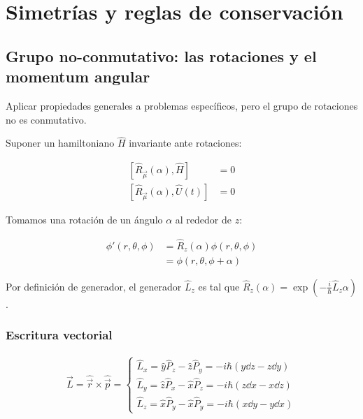 \chapter{Simetrías y reglas de conservación}

\section{}

\section{}

\section{Grupo no-conmutativo: las rotaciones y el momentum angular}

Aplicar propiedades generales a problemas específicos, pero el grupo de rotaciones no es conmutativo.

Suponer un hamiltoniano $\hat{H}$ invariante ante rotaciones:

\begin{align*}
    \left[\hat{R}_{\vec{\mu}}(\alpha),\hat{H}\right]&=0\\ 
    \left[\hat{R}_{\vec{\mu}}(\alpha),\hat{U}(t)\right]&=0
\end{align*}

Tomamos una rotación de un ángulo $\alpha$ al rededor de $z$:

\begin{align*}
    \phi'(r,\theta,\phi)
        &=\hat{R}_z(\alpha)\phi(r,\theta,\phi)\\
        &=\phi(r,\theta,\phi+\alpha)
\end{align*}

Por definición de generador, el generador $\hat{L}_z$ es tal que $\hat{R}_z(\alpha)=\exp\left(-\frac{i}{\hbar}\hat{L}_z\alpha\right)$.

\subsection{Escritura vectorial}

\begin{align*}
    \hat{\vec{L}}=\hat{\vec{r}}\times\hat{\vec{p}}=
    \begin{cases}
        \hat{L}_x=\hat{y}\hat{P}_z-\hat{z}\hat{P}_y=-i\hbar(y\dd z-z\dd y)\\
        \hat{L}_y=\hat{z}\hat{P}_x-\hat{x}\hat{P}_z=-i\hbar(z\dd x-x\dd z)\\
        \hat{L}_z=\hat{x}\hat{P}_y-\hat{x}\hat{P}_y=-i\hbar(x\dd y-y\dd x)
    \end{cases}
\end{align*}

